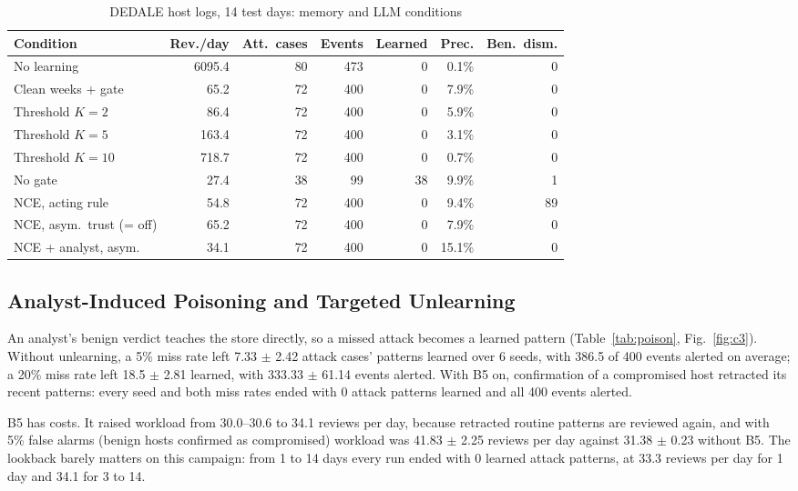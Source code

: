 \documentclass[conference]{IEEEtran}
\begin{document}
\begin{table}[t]
\caption{DEDALE host logs, 14 test days: memory and LLM conditions}
\label{tab:dedale}
\centering\scriptsize
\setlength{\tabcolsep}{1.8pt}
\begin{tabular}{@{}lrrrrrr@{}}
\toprule
Condition & Rev./day & Att.\ cases & Events & Learned & Prec. & Ben.\ dism. \\
\midrule
No learning & 6095.4 & 80 & 473 & 0 & 0.1\% & 0 \\
Clean weeks + gate & 65.2 & 72 & 400 & 0 & 7.9\% & 0 \\
Threshold $K{=}2$ & 86.4 & 72 & 400 & 0 & 5.9\% & 0 \\
Threshold $K{=}5$ & 163.4 & 72 & 400 & 0 & 3.1\% & 0 \\
Threshold $K{=}10$ & 718.7 & 72 & 400 & 0 & 0.7\% & 0 \\
No gate & 27.4 & 38 & 99 & 38 & 9.9\% & 1 \\
NCE, acting rule & 54.8 & 72 & 400 & 0 & 9.4\% & 89 \\
NCE, asym.\ trust (= off) & 65.2 & 72 & 400 & 0 & 7.9\% & 0 \\
NCE + analyst, asym. & 34.1 & 72 & 400 & 0 & 15.1\% & 0 \\
\bottomrule
\end{tabular}
\end{table}

\subsection{Analyst-Induced Poisoning and Targeted Unlearning}\label{sec:res-poison}

An analyst's benign verdict teaches the store directly, so a missed attack becomes a learned pattern
(Table~\ref{tab:poison}, Fig.~\ref{fig:c3}). Without unlearning, a 5\% miss rate left 7.33 $\pm$ 2.42 attack cases'
patterns learned over 6 seeds, with 386.5 of 400 events alerted on average; a 20\% miss rate left 18.5 $\pm$ 2.81
learned, with 333.33 $\pm$ 61.14 events alerted. With B5 on, confirmation of a compromised host retracted its
recent patterns: every seed and both miss rates ended with 0 attack patterns learned and all 400 events alerted.

B5 has costs. It raised workload from 30.0--30.6 to 34.1 reviews per day, because retracted routine patterns are
reviewed again, and with 5\% false alarms (benign hosts confirmed as compromised) workload was 41.83 $\pm$ 2.25
reviews per day against 31.38 $\pm$ 0.23 without B5. The lookback barely matters on this campaign: from 1 to 14
days every run ended with 0 learned attack patterns, at 33.3 reviews per day for 1 day and 34.1 for 3 to 14.
\end{document}

